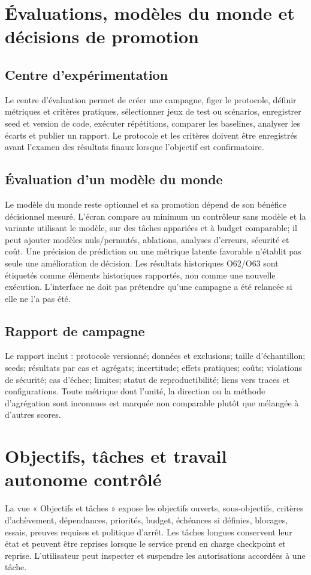 \documentclass[11pt,a4paper]{article}
\begin{document}
\section{Évaluations, modèles du monde et décisions de promotion}
\subsection{Centre d'expérimentation}
Le centre d'évaluation permet de créer une campagne, figer le protocole, définir métriques et critères pratiques, sélectionner jeux de test ou scénarios, enregistrer seed et version de code, exécuter répétitions, comparer les baselines, analyser les écarts et publier un rapport. Le protocole et les critères doivent être enregistrés avant l'examen des résultats finaux lorsque l'objectif est confirmatoire.

\subsection{Évaluation d'un modèle du monde}
Le modèle du monde reste optionnel et sa promotion dépend de son bénéfice décisionnel mesuré. L'écran compare au minimum un contrôleur sans modèle et la variante utilisant le modèle, sur des tâches appariées et à budget comparable; il peut ajouter modèles nuls/permutés, ablations, analyses d'erreurs, sécurité et coût. Une précision de prédiction ou une métrique latente favorable n'établit pas seule une amélioration de décision. Les résultats historiques O62/O63 sont étiquetés comme éléments historiques rapportés, non comme une nouvelle exécution. L'interface ne doit pas prétendre qu'une campagne a été relancée si elle ne l'a pas été.

\subsection{Rapport de campagne}
Le rapport inclut : protocole versionné; données et exclusions; taille d'échantillon; seeds; résultats par cas et agrégats; incertitude; effets pratiques; coûts; violations de sécurité; cas d'échec; limites; statut de reproductibilité; liens vers traces et configurations. Toute métrique dont l'unité, la direction ou la méthode d'agrégation sont inconnues est marquée non comparable plutôt que mélangée à d'autres scores.

\section{Objectifs, tâches et travail autonome contrôlé}
La vue « Objectifs et tâches » expose les objectifs ouverts, sous-objectifs, critères d'achèvement, dépendances, priorités, budget, échéances si définies, blocages, essais, preuves requises et politique d'arrêt. Les tâches longues conservent leur état et peuvent être reprises lorsque le service prend en charge checkpoint et reprise. L'utilisateur peut inspecter et suspendre les autorisations accordées à une tâche.
\end{document}
